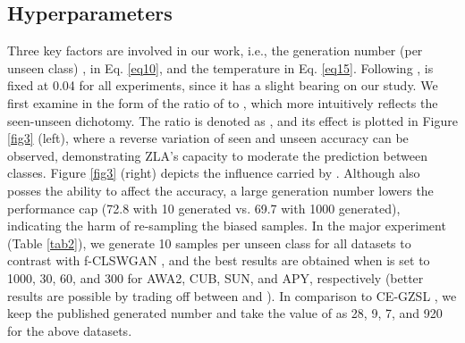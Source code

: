 \documentclass{article}
\begin{document}
\subsection{Hyperparameters}
\label{hype}
Three key factors are involved in our work, i.e., the generation number (per unseen class) ,  in Eq. \ref{eq10}, and the temperature  in Eq. \ref{eq15}. Following \cite{skorokhodov2020class},  is fixed at 0.04 for all experiments, since it has a slight bearing on our study. We first examine  in the form of the ratio of  to , which more intuitively reflects the seen-unseen dichotomy. The ratio is denoted as , and its effect is plotted in Figure \ref{fig3} (left), where a reverse variation of seen and unseen accuracy can be observed, demonstrating ZLA's capacity to moderate the prediction between classes. Figure \ref{fig3} (right) depicts the influence carried by . Although  also posses the ability to affect the accuracy, a large generation number lowers the performance cap (72.8 with 10 generated vs. 69.7 with 1000 generated), indicating the harm of re-sampling the biased samples. In the major experiment (Table \ref{tab2}), we generate 10 samples per unseen class for all datasets to contrast with f-CLSWGAN \cite{xian2018feature}, and the best results are obtained when  is set to 1000, 30, 60, and 300 for AWA2, CUB, SUN, and APY, respectively (better results are possible by trading off between  and ). In comparison to CE-GZSL \cite{han2021contrastive}, we keep the published generated number and take the value of  as 28, 9, 7, and 920 for the above datasets.
\end{document}
